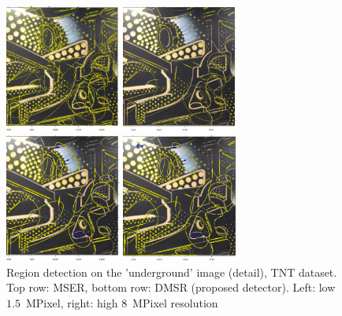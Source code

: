 \documentclass[conference,compsoc]{IEEEtran}
\begin{document}
\begin{figure}[htb]

\begin{minipage}[b]{.48\linewidth}
  \centering
  \centerline{\includegraphics[width=3.8cm]{tnt_mser_lores_zoom}}
\end{minipage}
\begin{minipage}[b]{0.5\linewidth}
  \centering
  \centerline{\includegraphics[width=3.8cm]{tnt_mser_hires_zoom}}
\end{minipage}
\hfill
\begin{minipage}[b]{.48\linewidth}
  \centering
  \centerline{\includegraphics[width=3.8cm]{tnt_dmsr_lores_zoom}}
\end{minipage}
\begin{minipage}[b]{0.505\linewidth}
  \centering
  \centerline{\includegraphics[width=3.8cm]{tnt_dmsr_hires_zoom}}
\end{minipage}
\hfill
\vspace{-0.5cm}
\caption{Region detection on the 'underground' image (detail), TNT dataset.  
Top row: MSER, bottom row: DMSR (proposed detector). Left: low $1.5$~MPixel, right: high $8$~MPixel resolution}
\label{fig:tnt_zoom}
\vspace{-0.4cm}
\end{figure}
\end{document}
